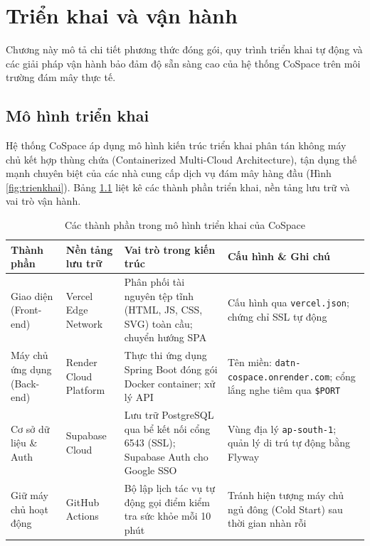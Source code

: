 \chapter{Triển khai và vận hành}
\label{ch:trienkhai}

Chương này mô tả chi tiết phương thức đóng gói, quy trình triển khai tự động và các giải pháp vận hành bảo đảm độ sẵn sàng cao của hệ thống CoSpace trên môi trường đám mây thực tế.

\section{Mô hình triển khai}
\label{sec:tk_mohinh}

Hệ thống CoSpace áp dụng mô hình kiến trúc triển khai phân tán không máy chủ kết hợp thùng chứa (Containerized Multi-Cloud Architecture), tận dụng thế mạnh chuyên biệt của các nhà cung cấp dịch vụ đám mây hàng đầu (Hình \ref{fig:trienkhai}). Bảng \ref{tab:tk_thanhphan} liệt kê các thành phần triển khai, nền tảng lưu trữ và vai trò vận hành.

\begin{table}[H]
\centering
\caption{Các thành phần trong mô hình triển khai của CoSpace}
\label{tab:tk_thanhphan}
\small
\renewcommand{\arraystretch}{1.25}
\begin{tabular}{|p{2.5cm}|p{3.0cm}|p{4.4cm}|p{3.9cm}|}
\hline
\textbf{Thành phần} & \textbf{Nền tảng lưu trữ} & \textbf{Vai trò trong kiến trúc} & \textbf{Cấu hình \& Ghi chú} \\
\hline
Giao diện (Front-end) & Vercel Edge Network & Phân phối tài nguyên tệp tĩnh (HTML, JS, CSS, SVG) toàn cầu; chuyển hướng SPA & Cấu hình qua \texttt{vercel.json}; chứng chỉ SSL tự động \\
\hline
Máy chủ ứng dụng (Back-end) & Render Cloud Platform & Thực thi ứng dụng Spring Boot đóng gói Docker container; xử lý API & Tên miền: \texttt{datn-cospace.\allowbreak onrender.com}; cổng lắng nghe tiêm qua \texttt{\$PORT} \\
\hline
Cơ sở dữ liệu \& Auth & Supabase Cloud & Lưu trữ PostgreSQL qua bể kết nối cổng 6543 (SSL); Supabase Auth cho Google SSO & Vùng địa lý \texttt{ap-south-1}; quản lý di trú tự động bằng Flyway \\
\hline
Giữ máy chủ hoạt động & GitHub Actions & Bộ lập lịch tác vụ tự động gọi điểm kiểm tra sức khỏe mỗi 10 phút & Tránh hiện tượng máy chủ ngủ đông (Cold Start) sau thời gian nhàn rỗi \\
\hline
\end{tabular}
\end{table}

